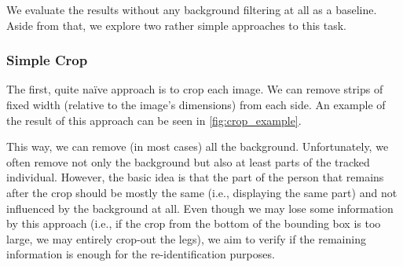 We evaluate the results without any background filtering at all as a baseline. Aside from that, we explore two rather simple approaches to this task. 

\subsubsection{Simple Crop}

The first, quite naïve approach is to crop each image. We can remove strips of fixed width (relative to the image's dimensions) from each side. An example of the result of this approach can be seen in \autoref{fig:crop_example}.

This way, we can remove (in most cases) all the background. Unfortunately, we often remove not only the background but also at least parts of the tracked individual. However, the basic idea is that the part of the person that remains after the crop should be mostly the same (i.e., displaying the same part) and not influenced by the background at all. Even though we may lose some information by this approach (i.e., if the crop from the bottom of the bounding box is too large, we may entirely crop-out the legs), we aim to verify if the remaining information is enough for the re-identification purposes.



